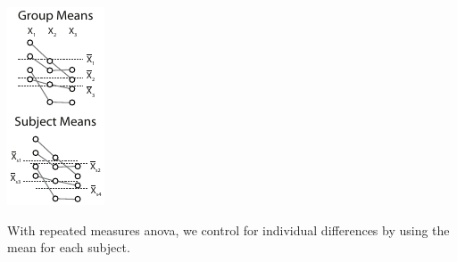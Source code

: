 \documentclass{tufte-handout}
\begin{document}
\begin{marginfigure}[50pt]
  \includegraphics[width=\linewidth]{images/handout5_repeated}%
  \label{fig:fullfig}%
  \caption{With repeated measures anova, we control for individual differences by using the mean for each subject.}
\end{marginfigure}
\end{document}
